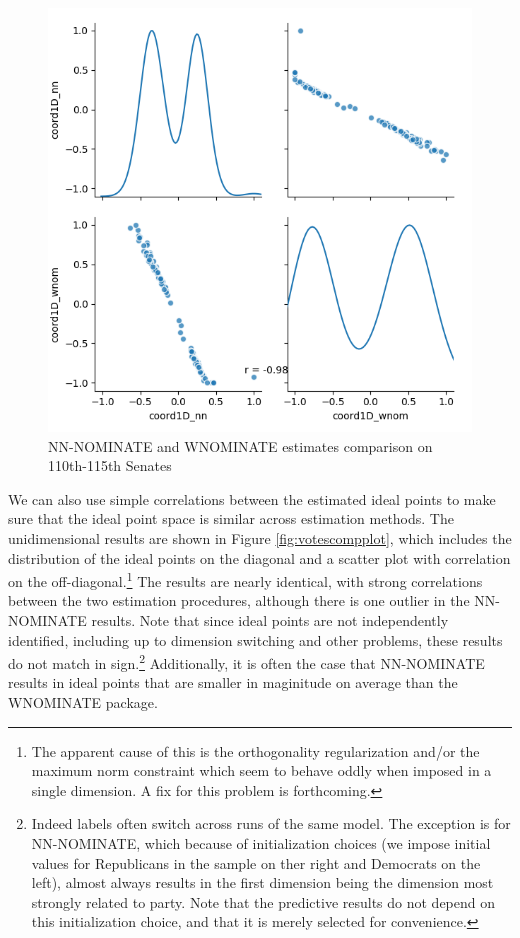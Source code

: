\documentclass[11pt,]{article}
\begin{document}
\begin{figure}

{\centering \includegraphics[width=0.75\linewidth]{votes_comp_plot}

}

\caption{\label{fig:votescompplot}NN-NOMINATE and WNOMINATE estimates comparison on 110th-115th Senates}\label{fig:unnamed-chunk-8}
\end{figure}

We can also use simple correlations between the estimated ideal points
to make sure that the ideal point space is similar across estimation
methods. The unidimensional results are shown in Figure
\ref{fig:votescompplot}, which includes the distribution of the ideal
points on the diagonal and a scatter plot with correlation on the
off-diagonal.\footnote{The apparent cause of this is the orthogonality
  regularization and/or the maximum norm constraint which seem to behave
  oddly when imposed in a single dimension. A fix for this problem is
  forthcoming.} The results are nearly identical, with strong
correlations between the two estimation procedures, although there is
one outlier in the NN-NOMINATE results. Note that since ideal points are
not independently identified, including up to dimension switching and
other problems, these results do not match in sign.\footnote{Indeed
  labels often switch across runs of the same model. The exception is
  for NN-NOMINATE, which because of initialization choices (we impose
  initial values for Republicans in the sample on ther right and
  Democrats on the left), almost always results in the first dimension
  being the dimension most strongly related to party. Note that the
  predictive results do not depend on this initialization choice, and
  that it is merely selected for convenience.} Additionally, it is often
the case that NN-NOMINATE results in ideal points that are smaller in
maginitude on average than the WNOMINATE package.
\end{document}
